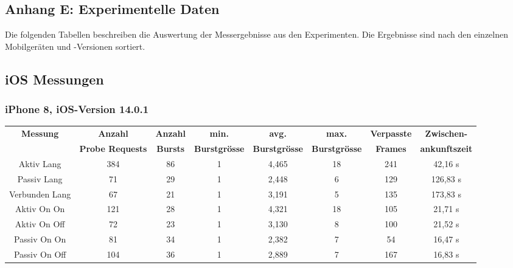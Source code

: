 \begin{landscape}
   \chapter{Anhang E: Experimentelle Daten
   \label{chapter:appendix:experimentaldata}}
   Die folgenden Tabellen beschreiben die Auswertung der Messergebnisse aus den Experimenten.
   Die Ergebnisse sind nach den einzelnen Mobilgeräten und -Versionen sortiert.

   \clearpage 

   \section*{iOS Messungen}
   \subsection*{iPhone 8, iOS-Version 14.0.1}
   \begin{table}[h!]
      \centering
      \begin{tabular}{|c|c|c|c|c|c|c|c|}
      \hline
      \textbf{Messung} & \textbf{Anzahl} & \textbf{Anzahl} & \textbf{min.} & \textbf{avg.} & \textbf{max.} & \textbf{Verpasste} & \textbf{Zwischen-}\\
      & \textbf{Probe Requests} & \textbf{Bursts} & \textbf{Burstgrösse} & \textbf{Burstgrösse} & \textbf{Burstgrösse} & \textbf{Frames} & \textbf{ankunftszeit}\\
      \hline
      Aktiv Lang & \phantom{0}384 & \phantom{0}86 & 1 & \phantom{0}4,465 & 18 & \phantom{0}241 & \phantom{0}42,16 s \\
      Passiv Lang & \phantom{00}71 & \phantom{0}29 & 1 & \phantom{0}2,448 & \phantom{0}6 & \phantom{0}129 & 126,83 s \\
      Verbunden Lang & \phantom{00}67 & \phantom{0}21 & 1 & \phantom{0}3,191 & \phantom{0}5 & \phantom{0}135 & 173,83 s \\
      Aktiv On On & \phantom{0}121 & \phantom{0}28 & 1 & \phantom{0}4,321 & 18 & \phantom{0}105 & \phantom{0}21,71 s \\
      Aktiv On Off & \phantom{00}72 & \phantom{0}23 & 1 & \phantom{0}3,130 & \phantom{0}8 & \phantom{0}100 & \phantom{0}21,52 s \\
      Passiv On On & \phantom{00}81 & \phantom{0}34 & 1 & \phantom{0}2,382 & \phantom{0}7 & \phantom{00}54 & \phantom{0}16,47 s \\
      Passiv On Off & \phantom{0}104 & \phantom{0}36 & 1 & \phantom{0}2,889 & \phantom{0}7 & \phantom{0}167 & \phantom{0}16,83 s \\

\end{tabular}
\end{table}
\end{landscape}
